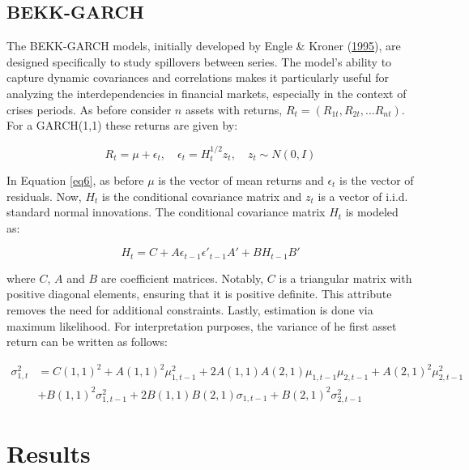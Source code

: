 \documentclass[11pt,preprint, authoryear]{elsarticle}
\numberwithin{equation}{section}
\numberwithin{figure}{section}
\numberwithin{table}{section}
\begin{document}
\hypertarget{bekk-garch}{%
\subsection{BEKK-GARCH}\label{bekk-garch}}

The BEKK-GARCH models, initially developed by Engle \& Kroner
(\protect\hyperlink{ref-Bekk1995}{1995}), are designed specifically to
study spillovers between series. The model's ability to capture dynamic
covariances and correlations makes it particularly useful for analyzing
the interdependencies in financial markets, especially in the context of
crises periods. As before consider \(n\) assets with returns,
\(R_t = (R_{1t}, R_{2t}, ... R_{nt})\). For a GARCH(1,1) these returns
are given by:

\begin{equation}
R_t = \mu + \epsilon_t, \quad \epsilon_t = H_t^{1/2} z_t, \quad z_t \sim N(0, I) \label{eq6}
\end{equation}

In Equation \ref{eq6}, as before \(\mu\) is the vector of mean returns
and \(\epsilon_t\) is the vector of residuals. Now, \(H_t\) is the
conditional covariance matrix and \(z_t\) is a vector of i.i.d. standard
normal innovations. The conditional covariance matrix \(H_t\) is modeled
as:

\begin{equation}
H_t = C + A \epsilon_{t-1} \epsilon'_{t-1} A' + B H_{t-1} B' \label{eq7}
\end{equation}

where \(C\), \(A\) and \(B\) are coefficient matrices. Notably, \(C\) is
a triangular matrix with positive diagonal elements, ensuring that it is
positive definite. This attribute removes the need for additional
constraints. Lastly, estimation is done via maximum likelihood. For
interpretation purposes, the variance of he first asset return can be
written as follows:

\begin{align}
\sigma^2_{1,t} & = C(1,1)^2 + A(1,1)^2\mu^2_{1,t-1} + 2A(1,1)A(2,1)\mu_{1,t-1}\mu_{2,t-1} + A(2,1)^2\mu^2_{2,t-1} \label{eq8}\\
& + B(1,1)^2\sigma^2_{1,t-1} + 2B(1,1)B(2,1)\sigma_{1,t-1} + B(2,1)^2\sigma^2_{2,t-1} 
\end{align}

\hypertarget{results}{%
\section{Results}\label{results}}
\end{document}
